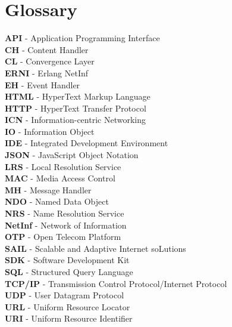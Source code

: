 \section{Glossary}
\textbf{API} - Application Programming Interface\\
\textbf{CH} - Content Handler\\
\textbf{CL} - Convergence Layer\\
\textbf{ERNI} - Erlang NetInf\\
\textbf{EH} - Event Handler\\
\textbf{HTML} - HyperText Markup Language\\
\textbf{HTTP} - HyperText Transfer Protocol\\
\textbf{ICN} - Information-centric Networking\\
\textbf{IO} - Information Object\\
\textbf{IDE} - Integrated Development Environment\\
\textbf{JSON} - JavaScript Object Notation\\
\textbf{LRS} - Local Resolution Service\\
\textbf{MAC} - Media Access Control\\
\textbf{MH} - Message Handler\\
\textbf{NDO} - Named Data Object\\
\textbf{NRS} - Name Resolution Service\\
\textbf{NetInf} - Network of Information\\
\textbf{OTP} - Open Telecom Platform\\
\textbf{SAIL} - Scalable and Adaptive Internet soLutions\\
\textbf{SDK} - Software Development Kit\\ 
\textbf{SQL} - Structured Query Language\\
\textbf{TCP/IP} - Transmission Control Protocol/Internet Protocol\\ 
\textbf{UDP} - User Datagram Protocol\\
\textbf{URL} - Uniform Resource Locator\\
\textbf{URI} - Uniform Resource Identifier\\







